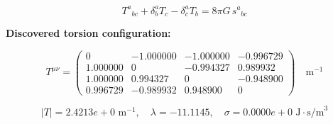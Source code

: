 
\begin{equation}
  T^a{}_{bc} + \delta^a_b T_c - \delta^a_c T_b = 8\pi G \, s^a{}_{bc}
\end{equation}

\textbf{Discovered torsion configuration:}

\begin{equation}
  T^{\mu\nu} = \begin{pmatrix}
    0 & -1.000000 & -1.000000 & -0.996729 \\
    1.000000 & 0 & -0.994327 & 0.989932 \\
    1.000000 & 0.994327 & 0 & -0.948900 \\
    0.996729 & -0.989932 & 0.948900 & 0
  \end{pmatrix} \quad \text{m}^{-1}
\end{equation}

\begin{equation}
  |T| = 2.4213e+0 \text{ m}^{-1}, \quad
  \lambda = -11.1145, \quad
  \sigma = 0.0000e+0 \text{ J}\cdot\text{s/m}^3
\end{equation}